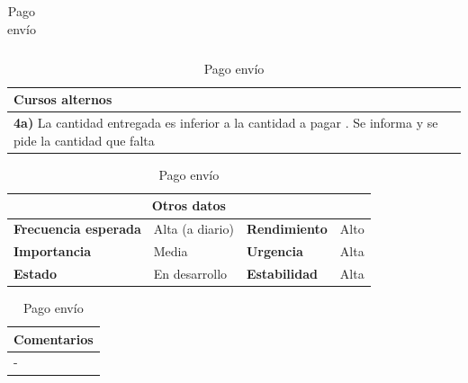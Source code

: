 \documentclass[12pt,spanish]{article}
\begin{document}
\begin{table}[H]
\begin{tabular}{|m{4pt}|m{7.33cm}|m{4pt}|m{7.33cm}|}
\end{tabular}

\vspace{1cm}

\begin{tabular}{|m{10pt}|m{7.15cm}|m{10pt}|m{7.15cm}|}
\hline
\multicolumn{4}{|m{16.2cm}|}{\textbf{Cursos alternos}} \\
\hline
\multicolumn{4}{|m{16.2cm}|}{\textbf{4a)} La cantidad entregada es inferior a la cantidad a pagar . Se informa y se pide la cantidad que falta} \\\hline
\end{tabular}

\vspace{1cm}

\begin{tabular}{|m{3.72cm}|m{3.72cm}|m{3.72cm}|m{3.72cm}|}
\hline
\multicolumn{4}{|c|}{\textbf{Otros datos}} \\
\hline
\textbf{Frecuencia esperada} & Alta (a diario) & \textbf{Rendimiento} & Alto \\
\hline
\textbf{Importancia} & Media & \textbf{Urgencia} & Alta \\
\hline
\textbf{Estado} & En desarrollo & \textbf{Estabilidad} & Alta \\
\hline
\end{tabular}

\vspace{1cm}

\begin{tabular}{|m{16.2cm}|}
\hline
\textbf{Comentarios} \\
\hline
- \\
\hline
\end{tabular}

\caption{Pago envío}

\end{table}


\end{document}
